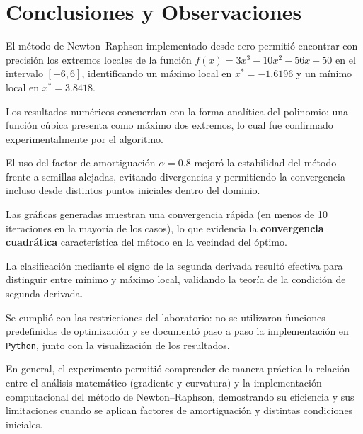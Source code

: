 \documentclass{article}
\begin{document}
\section{Conclusiones y Observaciones}

El método de Newton--Raphson implementado desde cero permitió encontrar con  precisión los extremos locales de la función \(f(x)=3x^3-10x^2-56x+50\) en el intervalo \([-6,6]\), identificando un máximo local en \(x^*=-1.6196\) y un mínimo local en \(x^*=3.8418\).
    
Los resultados numéricos concuerdan con la forma analítica del polinomio:
una función cúbica presenta como máximo dos extremos, lo cual fue confirmado experimentalmente por el algoritmo.
    
    El uso del factor de amortiguación \(\alpha=0.8\) mejoró la estabilidad
    del método frente a semillas alejadas, evitando divergencias y permitiendo
    la convergencia incluso desde distintos puntos iniciales dentro del dominio.
    
    Las gráficas generadas muestran una convergencia rápida (en menos de
    10 iteraciones en la mayoría de los casos), lo que evidencia la
    \textbf{convergencia cuadrática} característica del método en la vecindad
    del óptimo.
    
    La clasificación mediante el signo de la segunda derivada resultó
    efectiva para distinguir entre mínimo y máximo local, validando la teoría
    de la condición de segunda derivada.
    
    Se cumplió con las restricciones del laboratorio:
    no se utilizaron funciones predefinidas de optimización y se documentó
    paso a paso la implementación en \texttt{Python}, junto con la
    visualización de los resultados.


En general, el experimento permitió comprender de manera práctica la
relación entre el análisis matemático (gradiente y curvatura) y la
implementación computacional del método de Newton--Raphson, demostrando
su eficiencia y sus limitaciones cuando se aplican factores de
amortiguación y distintas condiciones iniciales.
\end{document}
